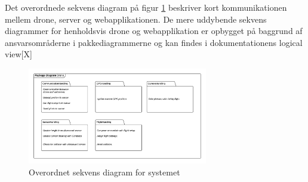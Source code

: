 Det overordnede sekvens diagram på figur \ref{fig:sd_overordnet} beskriver kort kommunikationen mellem drone, server og webapplikationen.
De mere uddybende sekvens diagrammer for henholdsvis drone og webapplikation er opbygget på baggrund af ansvarsområderne i pakkediagrammerne og kan findes i dokumentationens logical view[X]

\begin{figure}[H]
	\centering
	\includegraphics[width=0.7\textwidth]{Billeder/Projektbeskrivelse/Packagediagram_drone}
	\caption{Overordnet sekvens diagram for systemet}
	\label{fig:sd_overordnet}
\end{figure}